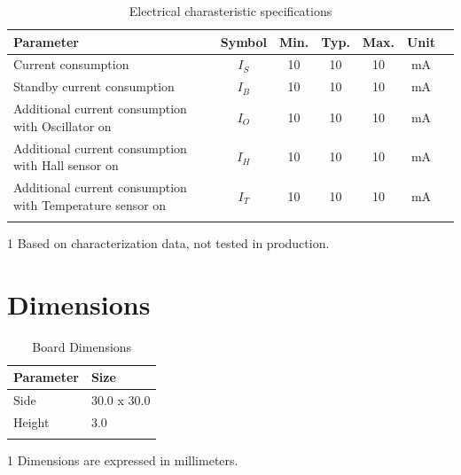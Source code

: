 \documentclass[10pt]{datasheet}
\begin{document}
\begin{table}[h]
\begin{threeparttable}
	\caption{Electrical charasteristic specifications}
\begin{tabularx}{\textwidth}{l | c | c c c | c | X}
    \thickhline
    \textbf{Parameter} & \textbf{Symbol} & \textbf{Min.} & \textbf{Typ.} & \textbf{Max.} &
    \textbf{Unit} \\
    \hline
    Current consumption  & $I_S$ & 10 & 10 & 10 & mA  \\
	Standby current consumption & $I_B$ & 10 & 10 & 10 & mA \\
	Additional current consumption with Oscillator on & $I_O$ & 10 & 10 & 10 & mA \\
	Additional current consumption with Hall sensor on & $I_H$ & 10 & 10 & 10 & mA \\
	Additional current consumption with Temperature sensor on & $I_T$ & 10 & 10 & 10 & mA \\
    \thickhline
\end{tabularx}
\begin{tablenotes}
\item[1]{Based on characterization data, not tested in production.}
\end{tablenotes}
\end{threeparttable}
\end{table}



\section{Dimensions}

\begin{table}[h]
\caption{Board Dimensions}
\begin{tabularx}{\textwidth}{l | X}
    \thickhline
    \textbf{Parameter} & \textbf{Size} \hspace{5cm} \\
    \hline
    Side & 30.0 x 30.0  \\
	Height & 3.0 \\
    \thickhline
\end{tabularx}
	\begin{tablenotes}
	\item[1]{Dimensions are expressed in millimeters.}
	\end{tablenotes}
\end{table}
\end{document}
